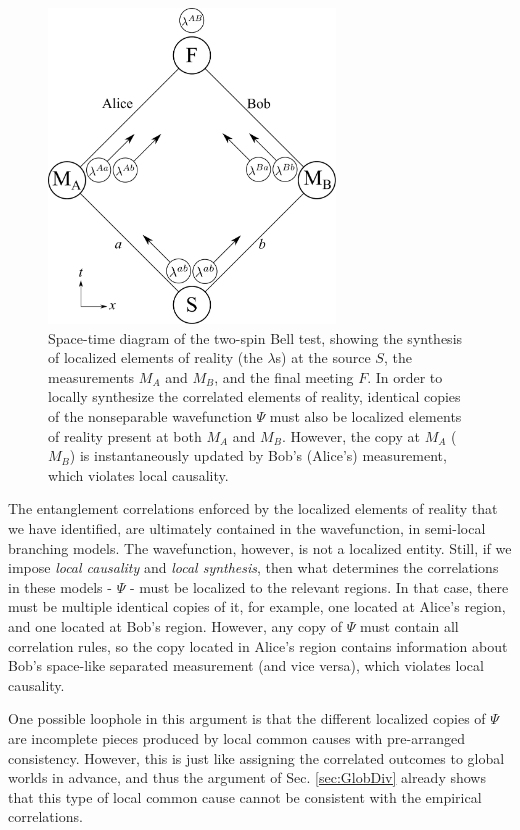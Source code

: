 \documentclass[12pt]{article}
\begin{document}
\begin{figure}[ht]
    \centering
    \includegraphics[width = 3in]{Local_Synthesis.pdf}
    \caption{Space-time diagram of the two-spin Bell test, showing the synthesis of localized elements of reality (the $\lambda$s) at the source $S$, the measurements $M_A$ and $M_B$, and the final meeting $F$.  In order to locally synthesize the correlated elements of reality, identical copies of the nonseparable wavefunction $\Psi$ must also be localized elements of reality present at both $M_A$ and $M_B$.  However, the copy at $M_A$ ($M_B$) is instantaneously updated by Bob's (Alice's) measurement, which violates local causality.}
    \label{fig:Synthesis}
\end{figure}

The entanglement correlations enforced by the localized elements of reality that we have identified, are ultimately contained in the wavefunction, in semi-local branching models. The wavefunction, however, is not a localized entity. Still, if we impose \textit{local causality} and \textit{local synthesis}, then what determines the correlations in these models - $\Psi$ - must be localized to the relevant regions. In that case, there must be multiple identical copies of it, for example, one located at Alice's region, and one located at Bob's region. However, any copy of $\Psi$ must contain all correlation rules, so the copy located in Alice's region contains information about Bob's space-like separated measurement (and vice versa), which violates local causality.

One possible loophole in this argument is that the different localized copies of $\Psi$ are incomplete pieces produced by local common causes with pre-arranged consistency.  However, this is just like assigning the correlated outcomes to global worlds in advance, and thus the argument of Sec. \ref{sec:GlobDiv} already shows that this type of local common cause cannot be consistent with the empirical correlations.
\end{document}
